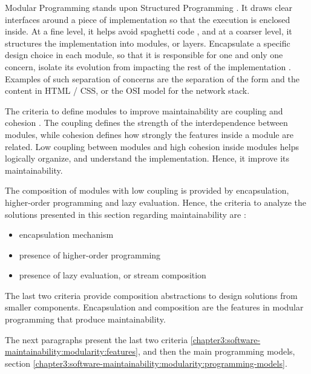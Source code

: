 Modular Programming stands upon Structured Programming \cite{Dijkstra1970}.
It draws clear interfaces around a piece of implementation so that the execution is enclosed inside.
At a fine level, it helps avoid spaghetti code \cite{Dijkstra1968a}, and at a coarser level, it structures the implementation \cite{Dijkstra1968} into modules, or layers.
Encapsulate a specific design choice in each module, so that it is responsible for one and only one concern, isolate its evolution from impacting the rest of the implementation \cite{Parnas1972, Tarr1999, Hursch1995}.
Examples of such separation of concerns are the separation of the form and the content in HTML / CSS, or the OSI model for the network stack.

The criteria to define modules to improve maintainability are coupling and cohesion \cite{Stevens1974}.
The coupling defines the strength of the interdependence between modules, while cohesion defines how strongly the features inside a module are related.
Low coupling between modules and high cohesion inside modules helps logically organize, and understand the implementation.
Hence, it improve its maintainability.

The composition of modules with low coupling is provided by encapsulation, higher-order programming and lazy evaluation.
Hence, the criteria to analyze the solutions presented in this section regarding maintainability are :
\begin{itemize}
\item encapsulation mechanism
\item presence of higher-order programming
\item presence of lazy evaluation, or stream composition
\end{itemize}
The last two criteria provide composition abstractions to design solutions from smaller components.
Encapsulation and composition are the features in modular programming that produce maintainability.

The next paragraphs present the last two criteria \ref{chapter3:software-maintainability:modularity:features}, and  then the main programming models, section \ref{chapter3:software-maintainability:modularity:programming-models}.

